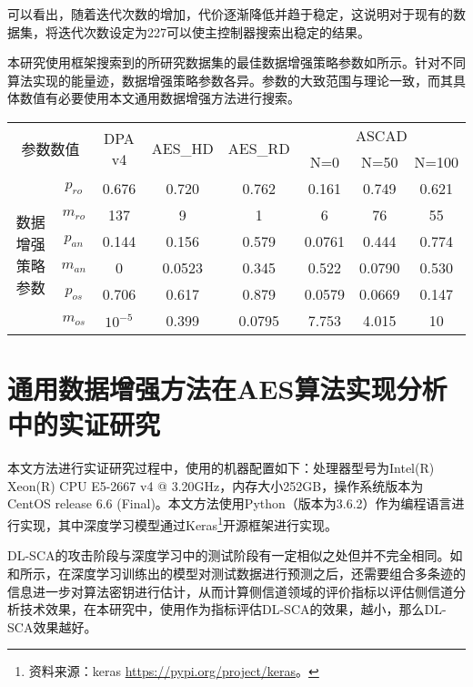 {	可以看出，随着迭代次数的增加，代价逐渐降低并趋于稳定，这说明对于现有的数据集，将迭代次数设定为227可以使主控制器搜索出稳定的结果。
	
	本研究使用框架搜索到的所研究数据集的最佳数据增强策略参数如所示。针对不同算法实现的能量迹，数据增强策略参数各异。参数的大致范围与理论一致，而其具体数值有必要使用本文通用数据增强方法进行搜索。
	
	\begin{table}[!h]
		\label{tab:paras}
		\centering
		\small 
		\begin{tabular}{cc|cccccc}
			\hline
			\multicolumn{2}{c|}{\multirow{2}{*}{参数数值}} &\multirow{2}{*}{DPA v4}&\multirow{2}{*}{AES\_HD}&\multirow{2}{*}{AES\_RD}& \multicolumn{3}{c}{ASCAD} \\
			\multicolumn{2}{c|}{}&&&&N=0 & N=50 & N=100 \\
			\hline
			\multirow{6}{*}{数据增强策略参数}
			&$p_{ro}$&0.676&0.720&0.762&0.161&0.749&0.621\\
			&$m_{ro}$&137&9&1&6&76&55\\
			&$p_{an}$&0.144&0.156&0.579&0.0761&0.444&0.774\\
			&$m_{an}$&   0&0.0523&0.345&0.522&0.0790&0.530\\
			&$p_{os}$&0.706&0.617&0.879&0.0579&0.0669&0.147\\
			&$m_{os}$&$10^{-5}$&0.399&0.0795&7.753&4.015&10\\
			\hline
			
		\end{tabular}   
	\end{table}

	\section{通用数据增强方法在AES算法实现分析中的实证研究}\label{sec:realexp}
	
	本文方法进行实证研究过程中，使用的机器配置如下：处理器型号为Intel(R) Xeon(R) CPU E5-2667 v4 @ 3.20GHz，内存大小252GB，操作系统版本为CentOS release 6.6 (Final)。本文方法使用Python（版本为3.6.2）作为编程语言进行实现，其中深度学习模型通过Keras\footnote{资料来源：keras \href{https://pypi.org/project/keras}{https://pypi.org/project/keras}。}开源框架进行实现。

	DL-SCA的攻击阶段与深度学习中的测试阶段有一定相似之处但并不完全相同。如和所示，在深度学习训练出的模型对测试数据进行预测之后，还需要组合多条迹的信息进一步对算法密钥进行估计，从而计算侧信道领域的评价指标以评估侧信道分析技术效果，在本研究中，使用\chenggongtiaoshu 作为指标评估DL-SCA的效果，\chenggongtiaoshu 越小，那么DL-SCA效果越好。

}
